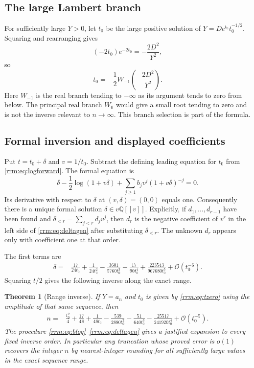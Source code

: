 \documentclass[11pt]{article}
\newtheorem{theorem}{Theorem}[section]
\theoremstyle{remark}\newtheorem{remark}[theorem]{Remark}
\newcommand{\OO}{\mathcal O}
\begin{document}
\subsection{The large Lambert branch}
For sufficiently large $Y>0$, let $t_0$ be the large positive solution of $Y=De^{t_0}t_0^{-1/2}$. Squaring and rearranging gives
\[
 (-2t_0)e^{-2t_0}=-\frac{2D^2}{Y^2},
\]
so
\begin{equation}\label{rrm:eq:tzero}
 t_0=-\frac12W_{-1}\left(-\frac{2D^2}{Y^2}\right).
\end{equation}
Here $W_{-1}$ is the real branch tending to $-\infty$ as its argument tends to zero from below. The principal real branch $W_0$ would give a small root tending to zero and is not the inverse relevant to $n\to\infty$. This branch selection is part of the formula.

\subsection{Formal inversion and displayed coefficients}
Put $t=t_0+\delta$ and $v=1/t_0$. Subtract the defining leading equation for $t_0$ from \eqref{rrm:eq:logforward}. The formal equation is
\begin{equation}\label{rrm:eq:deltagen}
 \delta-\frac12\log(1+v\delta)
 +\sum_{j\ge1}b_jv^j(1+v\delta)^{-j}=0.
\end{equation}
Its derivative with respect to $\delta$ at $(v,\delta)=(0,0)$ equals one. Consequently there is a unique formal solution $\delta\in v\mathbb Q[[v]]$. Explicitly, if $d_1,\ldots,d_{r-1}$ have been found and $\delta_{<r}=\sum_{j<r}d_jv^j$, then $d_r$ is the negative coefficient of $v^r$ in the left side of \eqref{rrm:eq:deltagen} after substituting $\delta_{<r}$. The unknown $d_r$ appears only with coefficient one at that order.

The first terms are
\begin{align}
 \delta={}&\frac{17}{24t_0}+\frac1{24t_0^2}
 -\frac{3601}{5760t_0^3}-\frac{17}{90t_0^4}
 +\frac{223543}{967680t_0^5}+\OO(t_0^{-6}).
 \label{rrm:eq:delta}
\end{align}
Squaring $t/2$ gives the following inverse along the exact range.

\begin{theorem}[Range inverse]\label{rrm:thm:rangeinverse}
If $Y=a_n$ and $t_0$ is given by \eqref{rrm:eq:tzero} using the amplitude of that same sequence, then
\begin{align}
 n={}&\frac{t_0^2}{4}+\frac{17}{48}+\frac1{48t_0}
 -\frac{539}{2880t_0^2}-\frac{51}{640t_0^3}
 -\frac{25517}{241920t_0^4}+\OO(t_0^{-5}).
 \label{rrm:eq:rangeinverse}
\end{align}
The procedure \eqref{rrm:eq:blog}--\eqref{rrm:eq:deltagen} gives a justified expansion to every fixed inverse order. In particular any truncation whose proved error is $o(1)$ recovers the integer $n$ by nearest-integer rounding for all sufficiently large values in the exact sequence range.
\end{theorem}
\end{document}
